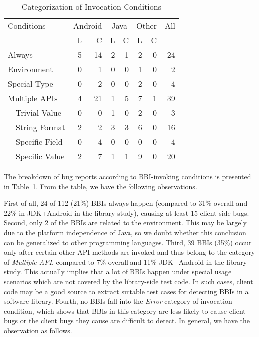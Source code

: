 \begin{table}
	\center
	\caption{\label{table:condition} Categorization of Invocation Conditions}
		
	\begin{tabular}{|l|l|r|r|r|r|r|r|r|}
		\hline
		\multicolumn{2}{|l|}{Conditions} & \multicolumn{2}{|c|}{Android} & \multicolumn{2}{|c|}{Java} & \multicolumn{2}{|c|}{Other} & All\\
		\cline{3-8}
		 \multicolumn{2}{|l|}{}      & L & C & L & C & L & C& \\
		\hline
		\multicolumn{2}{|l|}{Always} &5 &  14  &2  & 1   & 2 &0& 24 \\ 
		\hline
		\multicolumn{2}{|l|}{Environment}  &0 & 1   & 0 & 0   & 1 &0& 2 \\ 
		\hline
		\multicolumn{2}{|l|}{Special Type} &0 &  2  & 0 &  0  & 2 &0& 4 \\ 	
		\hline		
		\multicolumn{2}{|l|}{Multiple APIs} &4& 21 & 1 & 5& 7 &1& 39 \\ 	
		\hline		
		
		\NameEntry{4}{Input}& Trivial Value &0 &  0  & 1 &  0  & 2 &0& 3 \\ 
		& String Format &2 &   2 & 3 &   3 & 6 &0& 16 \\ 
	    & Specific Field &0 & 4   & 0 &  0  & 0 &0& 4 \\ 
		& Specific Value &2 &  7  & 1 &  1  & 9 &0& 20 \\ 
		\hline
	\end{tabular}
	\vspace{+0.3cm}			
\end{table}


The breakdown of bug reports according to BBI-invoking conditions is presented in Table~\ref{table:condition}. From the table, we have the following observations. 

First of all, 24 of 112 (21\%) BBIs always happen (compared to 31\% overall and 22\% in JDK+Android in the library study), causing at least 15 client-side bugs. Second, only 2 of the BBIs are related to the environment. This may be largely due to the platform independence of Java, so we doubt whether this conclusion can be generalized to other programming languages. 
Third, 39 BBIs (35\%) occur only after certain other API methods are invoked and thus belong to the category of \textit{Multiple API}, compared to 7\% overall and 11\% JDK+Android in the library study. This actually implies that a lot of BBIs happen under special usage scenarios which are not covered by the library-side test code. In such cases, client code may be a good source to extract suitable test cases for detecting BBIs in a software library. 
Fourth, no BBIs fall into the \textit{Error} category of invocation-condition, which shows that BBIs in this category are less likely to cause client bugs or the client bugs they cause are difficult to detect. In general, we have the observation as follows.\\

